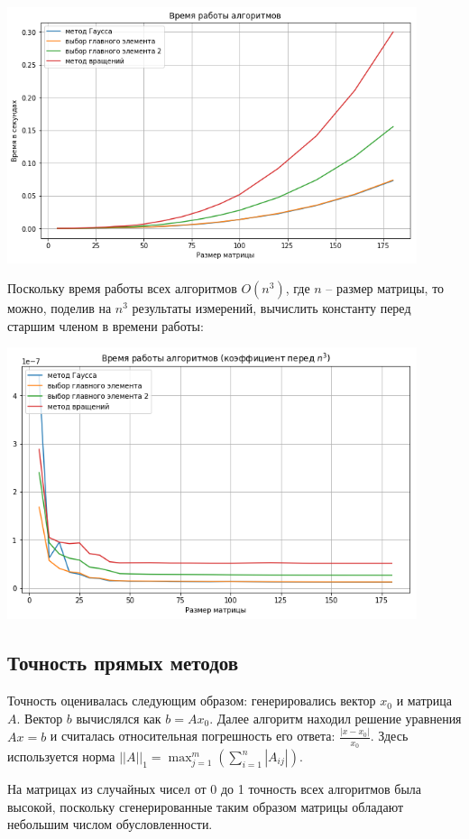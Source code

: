 \documentclass{article}
\begin{document}
\includegraphics[width=0.9\textwidth]{gr_time.png}

Поскольку время работы всех алгоритмов $O(n^3)$, где $n$ -- размер матрицы, то можно, поделив на $n^3$ результаты измерений, вычислить константу перед старшим членом в времени работы:

\includegraphics[width=0.9\textwidth]{gr_time_2.png}

\subsection{Точность прямых методов}

Точность оценивалась следующим образом: генерировались вектор $x_0$ и матрица $A$. Вектор $b$ вычислялся как $b = Ax_0$. Далее алгоритм находил решение уравнения $Ax=b$ и считалась относительная погрешность его ответа: $\frac{|x - x_0|}{x_0}$. Здесь используется норма $|| A ||_1 = \max_{j=1}^m \left( \sum_{i=1}^n |A_{ij}| \right)$.

На матрицах из случайных чисел от 0 до 1 точность всех алгоритмов была высокой, поскольку сгенерированные 
таким образом матрицы обладают небольшим числом обусловленности.
\end{document}
